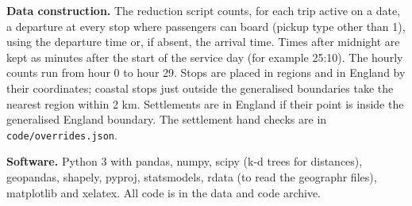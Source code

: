 \documentclass[11pt,a4paper]{article}
\begin{document}
\textbf{Data construction.} The reduction script counts, for each trip active on a date, a departure at every stop where passengers can board (pickup type other than 1), using the departure time or, if absent, the arrival time. Times after midnight are kept as minutes after the start of the service day (for example 25:10). The hourly counts run from hour 0 to hour 29. Stops are placed in regions and in England by their coordinates; coastal stops just outside the generalised boundaries take the nearest region within 2 km. Settlements are in England if their point is inside the generalised England boundary. The settlement hand checks are in \texttt{code/overrides.json}.

\textbf{Software.} Python 3 with pandas, numpy, scipy (k-d trees for distances), geopandas, shapely, pyproj, statsmodels, rdata (to read the geographr files), matplotlib and xelatex. All code is in the data and code archive.
\end{document}
